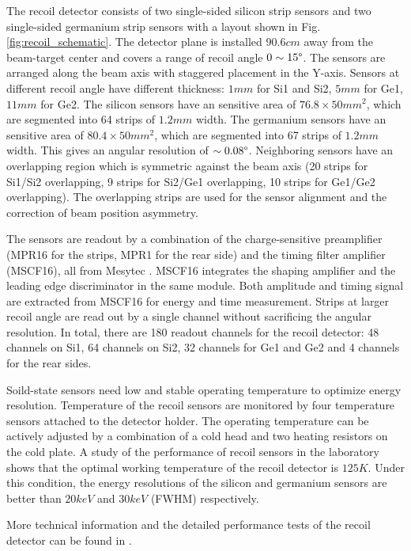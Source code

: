 \documentclass[number,5p]{elsarticle}
\begin{document}
The recoil detector consists of two single-sided silicon strip sensors and two
single-sided germanium strip sensors with a layout shown in Fig. \ref{fig:recoil_schematic}.
The detector plane is installed $90.6 cm$ away from the beam-target center
and covers a range of recoil angle $0\sim15\degree$.
The sensors are arranged along the beam axis with staggered placement in the Y-axis.
Sensors at different recoil angle have different thickness: $1 mm$ for Si1 and Si2, $5 mm$ for Ge1, $11 mm$ for Ge2.
The silicon sensors have an sensitive area of \(76.8 \times 50 mm^2\), which are
segmented into 64 strips of $1.2 mm$ width.
The germanium sensors have an sensitive area of \(80.4 \times 50 mm^2\), which are segmented into 67 strips of $1.2 mm$ width.
This gives an angular resolution of $\sim0.08\degree$.
Neighboring sensors have an overlapping region which is symmetric against
the beam axis (20 strips for Si1/Si2 overlapping, 9 strips for Si2/Ge1 overlapping, 10 strips for Ge1/Ge2 overlapping).
The overlapping strips are used for the sensor alignment and the correction of beam position asymmetry.

The sensors are readout by a combination of the charge-sensitive preamplifier (MPR16 for the strips, MPR1 for the rear side) 
and the timing filter amplifier (MSCF16), all from Mesytec \cite{mesytec}. 
MSCF16 integrates the shaping amplifier and the leading edge discriminator in the same module.
Both amplitude and timing signal are extracted from MSCF16 for energy and time measurement.
Strips at larger recoil angle are read out by a single channel without sacrificing the angular resolution.
In total, there are 180 readout channels for the recoil detector: 
48 channels on Si1, 64 channels on Si2, 32 channels for Ge1 and Ge2 and 4
channels for the rear sides. 

Soild-state sensors need low and stable operating temperature to optimize energy
resolution.
Temperature of the recoil sensors are monitored by four temperature sensors
attached to the detector holder.
The operating temperature can be actively adjusted by a combination of a cold head and two heating resistors on the cold plate.
A study of the performance of recoil sensors in the laboratory shows that the
optimal working temperature of the recoil detector is $125 K$.
Under this condition, the energy resolutions of the silicon and germanium
sensors are better than $20 keV$ and $30 keV$ (FWHM) respectively.

More technical information and the detailed performance tests of the recoil detector can be found in \cite{recoil_article}.
\end{document}
